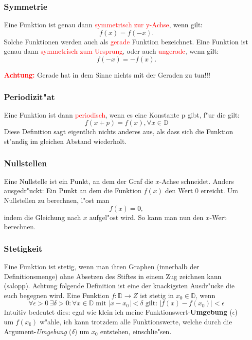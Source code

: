 \subsubsection{Symmetrie} \label{sec:symmetrie}
Eine Funktion ist genau dann \textcolor{red}{symmetrisch zur y-Achse}, wenn gilt:
\begin{equation*}
f(x)=f(-x).
\end{equation*}
Solche Funktionen werden auch als \textcolor{red}{gerade} Funktion bezeichnet. Eine Funktion ist genau dann \textcolor{red}{symmetrisch zum Ursprung}, oder auch \textcolor{red}{ungerade}, wenn gilt:
\begin{equation*}
f(-x)=-f(x).
\end{equation*}
\begin{center}
\textbf{\textcolor{red}{Achtung:}} Gerade hat in dem Sinne nichts mit der Geraden zu tun!!!
\end{center}

\subsubsection{Periodizit"at}
Eine Funktion ist dann \textcolor{red}{periodisch}, wenn es eine Konstante p gibt, f"ur die gilt:
\begin{equation*}
f(x+p) = f(x), \forall x\in\mathbb{D}
\end{equation*}
Diese Definition sagt eigentlich nichts anderes aus, als dass sich die Funktion st"andig im gleichen Abstand wiederholt.

\subsubsection{Nullstellen} \label{sec:nullstellen}
Eine Nullstelle ist ein Punkt, an dem der Graf die $x$-Achse schneidet. Anders ausgedr"uckt: Ein Punkt an dem die Funktion $f(x)$ den Wert $0$ erreicht. Um Nullstellen zu berechnen, l"ost man
\begin{equation*}
f(x) = 0,
\end{equation*}
indem die Gleichung nach $x$ aufgel"ost wird. So kann man nun den $x$-Wert berechnen.

\subsubsection{Stetigkeit}
Eine Funktion ist stetig, wenn man ihren Graphen (innerhalb der Definitionsmenge) ohne Absetzen des Stiftes in einem Zug zeichnen kann (salopp). Achtung folgende Definition ist eine der knackigsten Ausdr"ucke die euch begegnen wird. Eine Funktion $f : \mathbb{D} \to Z$ ist stetig in $x_0 \in \mathbb{D}$, wenn
\begin{equation*}
\forall \epsilon > 0 \ \exists \delta > 0 : \forall x \in \mathbb{D} \text{ mit } \left|x - x_0 \right| < \delta \text{ gilt: } \left| f(x) - f(x_0) \right| < \epsilon 
\end{equation*}
Intuitiv bedeutet dies: egal wie klein ich meine Funktionswert-\textbf{Umgebung} ($\epsilon$) um $f(x_0)$ w"ahle, ich kann trotzdem alle Funktionswerte, welche durch die Argument-\textit{Umgebung} ($\delta$) um $x_0$ entstehen, einschlie"sen.

